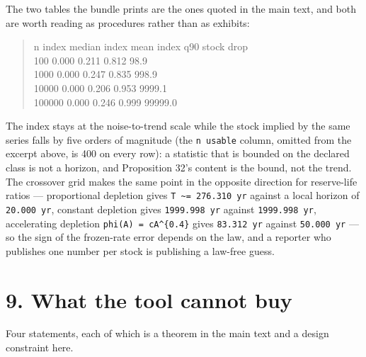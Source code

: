 \documentclass[11pt]{article}
\begin{document}
The two tables the bundle prints are the ones quoted in the main text, and both are worth reading as procedures rather than as exhibits:

\begin{quote}\ttfamily\footnotesize\raggedright\setlength{\parskip}{0pt}
       n   index median     index mean      index q90     stock drop\\
     100          0.000          0.211          0.812           98.9\\
    1000          0.000          0.247          0.835          998.9\\
   10000          0.000          0.206          0.953         9999.1\\
  100000          0.000          0.246          0.999        99999.0
\end{quote}

The index stays at the noise-to-trend scale while the stock implied by the same series falls by five orders of magnitude (the \texttt{n usable} column, omitted from the excerpt above, is 400 on every row): a statistic that is bounded on the declared class is not a horizon, and Proposition 32's content is the bound, not the trend. The crossover grid makes the same point in the opposite direction for reserve-life ratios --- proportional depletion gives \texttt{T \textasciitilde{}= 276.310 yr} against a local horizon of \texttt{20.000 yr}, constant depletion gives \texttt{1999.998 yr} against \texttt{1999.998 yr}, accelerating depletion \texttt{phi(A) = cA\textasciicircum{}\{0.4\}} gives \texttt{83.312 yr} against \texttt{50.000 yr} --- so the sign of the frozen-rate error depends on the law, and a reporter who publishes one number per stock is publishing a law-free guess.

\vspace{0.8em}

\section*{9. What the tool cannot buy}\label{9-what-the-tool-cannot-buy}

Four statements, each of which is a theorem in the main text and a design constraint here.
\end{document}
